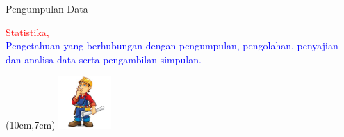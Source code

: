 \documentclass[main.tex]{subfiles}
\begin{document}

\begin{frame}[c]
	\large Pengumpulan \huge Data

\end{frame}

\begin{frame}[c]
	\begin{center}
		\textcolor{red}{Statistika,}\\  \textcolor{blue}{Pengetahuan yang berhubungan dengan pengumpulan, pengolahan, penyajian dan analisa data serta pengambilan simpulan.}
	\end{center}
	\begin{textblock*}{2cm}(10cm,7cm) %
		\includegraphics[width=2cm]{figures/cons}
	\end{textblock*}
\end{frame}
\end{document}
